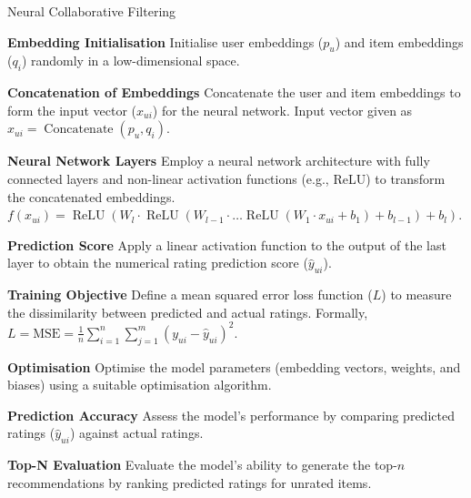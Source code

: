 \begin{algorithm}
    \caption{Neural Collaborative Filtering}
    \begin{algorithmic}[1]
      \State \textbf{Embedding Initialisation}
      \newline \quad Initialise user embeddings ($p_u$) and item embeddings ($q_i$) randomly in a low-dimensional space.
    
      \State \textbf{Concatenation of Embeddings}
      \newline \quad Concatenate the user and item embeddings to form the input vector ($x_{u i}$) for the neural network. Input vector given as $x_{u i} = \operatorname{Concatenate}(p_u, q_i)$.
    
      \State \textbf{Neural Network Layers}
      \newline \quad Employ a neural network architecture with fully connected layers and non-linear activation functions (e.g., ReLU) to transform the concatenated embeddings. 
      \newline \quad $f(x_{u i}) = \operatorname{ReLU}\left(W_l \cdot \operatorname{ReLU}\left(W_{l-1} \cdot \ldots \operatorname{ReLU}\left(W_1 \cdot x_{u i} + b_1\right) + b_{l-1}\right) + b_l\right)$.
    
      \State \textbf{Prediction Score}
      \newline \quad Apply a linear activation function to the output of the last layer to obtain the numerical rating prediction score ($\hat{y}_{u i}$).
    
      \State \textbf{Training Objective}
      \newline \quad Define a mean squared error loss function ($L$) to measure the dissimilarity between predicted and actual ratings. Formally, $L = \text{MSE} = \frac{1}{n} \sum_{i=1}^{n} \sum_{j=1}^{m} (y_{ui} - \hat{y}_{ui})^2$.
    
      \State \textbf{Optimisation}
      \newline \quad Optimise the model parameters (embedding vectors, weights, and biases) using a suitable optimisation algorithm.
    
      \State \textbf{Prediction Accuracy}
      \newline \quad Assess the model's performance by comparing predicted ratings ($\hat{y}_{u i}$) against actual ratings.
    
      \State \textbf{Top-N Evaluation}
      \newline \quad Evaluate the model's ability to generate the top-$n$ recommendations by ranking predicted ratings for unrated items.
    \end{algorithmic}
    \end{algorithm}
    
